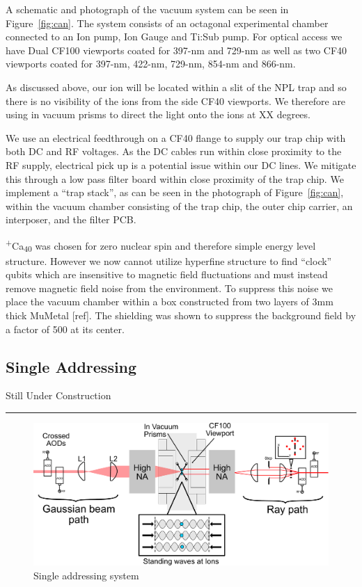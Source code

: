 \documentclass[12pt]{iopart}
\begin{document}
A schematic and photograph of the vacuum system can be seen in Figure~\ref{fig:can}. The system
consists of an octagonal experimental chamber connected to an Ion
pump, Ion Gauge and Ti:Sub pump. For optical access we have Dual CF100
viewports coated for 397-nm and 729-nm as well as two CF40 viewports
coated for 397-nm, 422-nm, 729-nm, 854-nm and 866-nm.

As discussed above, our ion will be located within a slit of the NPL
trap and so there is no visibility of the ions from the side CF40
viewports. We therefore are using in vacuum prisms to direct the light
onto the ions at XX degrees.

We use an electrical feedthrough on a CF40 flange to supply our trap
chip with both DC and RF voltages. As the DC cables run within close
proximity to the RF supply, electrical pick up is a potential issue
within our DC lines. We mitigate this through a low pass filter board
within close proximity of the trap chip. We implement a ``trap
stack'', as can be seen in the photograph of Figure~\ref{fig:can}, within the vacuum chamber consisting of the
trap chip, the outer chip carrier, an interposer, and the filter PCB.

\textsuperscript{+}Ca\textsubscript{40} was chosen for zero nuclear
spin and therefore simple energy level structure. However we now
cannot utilize hyperfine structure to find ``clock'' qubits which are
insensitive to magnetic field fluctuations and must instead remove
magnetic field noise from the environment. To suppress this noise 
we place the vacuum chamber within a box constructed from two layers
of 3mm thick MuMetal [ref]. The shielding was shown to suppress the
background field by a factor of 500 at its center.

\subsection{Single Addressing}

\begin{center}
Still Under Construction \\
\end{center}
\hrule\vspace{1em}

\begin{figure}
  \begin{center}
   \noindent\includegraphics[width=\linewidth]{figures/vac_can_AOD_small.pdf}
  \end{center}
  \caption{Single addressing system}
  \label{fig:AOD}
\end{figure}
\end{document}
